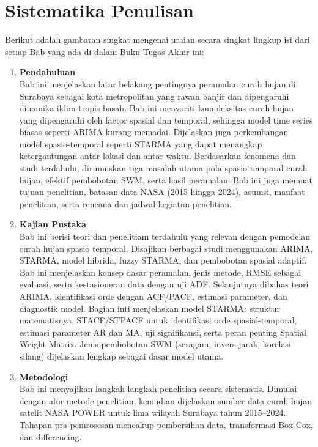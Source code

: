 \section{Sistematika Penulisan}
Berikut adalah gambaran singkat mengenai uraian secara singkat lingkup isi dari setiap Bab yang ada di dalam Buku Tugas Akhir ini:
\begin{enumerate}
    \item \textbf{Pendahuluan} \\
    Bab ini menjelaskan latar belakang pentingnya peramalan curah hujan di Surabaya sebagai kota metropolitan yang rawan banjir dan dipengaruhi dinamika iklim tropis basah.
    Bab ini menyoriti kompleksitas curah hujan yang dipengaruhi oleh factor spasial dan temporal, sehingga model time series biasas seperti ARIMA kurang memadai. 
    Dijelaskan juga perkembangan model spasio-temporal seperti STARMA yang dapat menangkap ketergantungan antar lokasi dan antar waktu.
    Berdasarkan fenomena dan studi terdahulu, dirumuskan tiga masalah utama pola spasio temporal curah hujan, efektif pembobotan  SWM, serta hasil peramalan.
    Bab ini juga memuat tujuan penelitian, batasan data NASA (2015 hingga 2024), asumsi, manfaat penelitian, serta rencana dan jadwal kegiatan penelitian.
    \item \textbf{Kajian Pustaka} \\
    Bab ini berisi teori dan penelitiam terdahulu yang relevan dengan pemodelan curah hujan spasio temporal.
    Disajikan berbagai studi menggunakan ARIMA, STARMA, model hibrida, fuzzy STARMA, dan pembobotan spasial adaptif.
    Bab ini menjelaskan konsep dasar peramalan, jenis metode, RMSE sebagai evaluasi, serta kestasioneran data dengan uji ADF.
    Selanjutnya dibahas teori ARIMA, identifikasi orde dengan ACF/PACF, estimasi parameter, dan diagnostik model.
    Bagian inti menjelaskan model STARMA: struktur matematisnya, STACF/STPACF untuk identifikasi orde spasial-temporal, estimasi parameter AR dan MA, uji signifikansi, serta peran penting Spatial Weight Matrix.
    Jenis pembobotan SWM (seragam, invers jarak, korelasi silang) dijelaskan lengkap sebagai dasar model utama.
    \item \textbf{Metodologi} \\ 
    Bab ini menyajikan langkah-langkah penelitian secara sistematis.
    Dimulai dengan alur metode penelitian, kemudian dijelaskan sumber data curah hujan satelit NASA POWER untuk lima wilayah Surabaya tahun 2015–2024.
    Tahapan pra-pemrosesan mencakup pembersihan data, transformasi Box-Cox, dan differencing.

\end{enumerate}

